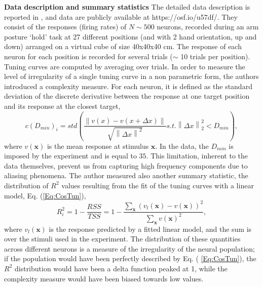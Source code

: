 \documentclass[a4paper]{article}%
\begin{document}
\textbf{Data description and summary statistics} The detailed data description
is reported in \cite{Lalazar2016TuningConnectivity}, and data are publicly
available at https://osf.io/u57df/. They consist of the responses (firing
rates) of $N \sim500$ neurons, recorded during an arm posture `hold' task at
27 different positions (and with 2 hand orientation, up and down) arranged on
a virtual cube of size 40x40x40 cm. The response of each neuron for each
position is recorded for several trials ($\sim$ 10 trials per position).
Tuning curves are computed by averaging over trials. In order to measure the
level of irregularity of a single tuning curve in a non parametric form, the
authors introduced a complexity measure. For each neuron, it is defined as the
standard deviation of the discrete derivative between the response at one
target position and its response at the closest target,
\begin{equation}
c(D_{min})_{i} = std\left(  \frac{\left\|  v(x) - v(x+\Delta x)\right\|  }
{\sqrt{\left\|  \Delta x\right\|  ^{2}}} s.t. \left\|  \Delta x\right\|
_{2}^{2} < D_{min}\right)  ,
\end{equation}
where $v(\mathbf{x})$ is the mean response at stimulus $\mathbf{x}$. In the
data, the $D_{min}$ is imposed by the experiment and is equal to $35$. This
limitation, inherent to the data themselves, prevent us from capturing high
frequency components due to aliasing phenomena. The author measured also
another summary statistic, the distribution of $R^{2}$ values resulting from
the fit of the tuning curves with a linear model, Eq. (\ref{Eq:CosTun}),
\begin{equation}
R^{2}_{i} = 1- \frac{RSS}{TSS} = 1-\frac{\sum_{\mathbf{x}}\left(
v_{l}(\mathbf{x}) - v(\mathbf{x})\right)  ^{2}}{\sum_{\mathbf{x}}
v(\mathbf{x})^{2}},
\end{equation}
where $v_{l}(\mathbf{x})$ is the response predicted by a fitted linear model,
and the sum is over the stimuli used in the experiment. The distribution of
these quantities across different neurons is a measure of the irregularity of
the neural population; if the population would have been perfectly described
by Eq. ( \ref{Eq:CosTun}), the $R^{2}$ distribution would have been a delta
function peaked at 1, while the complexity measure would have been biased
towards low values.
\end{document}

